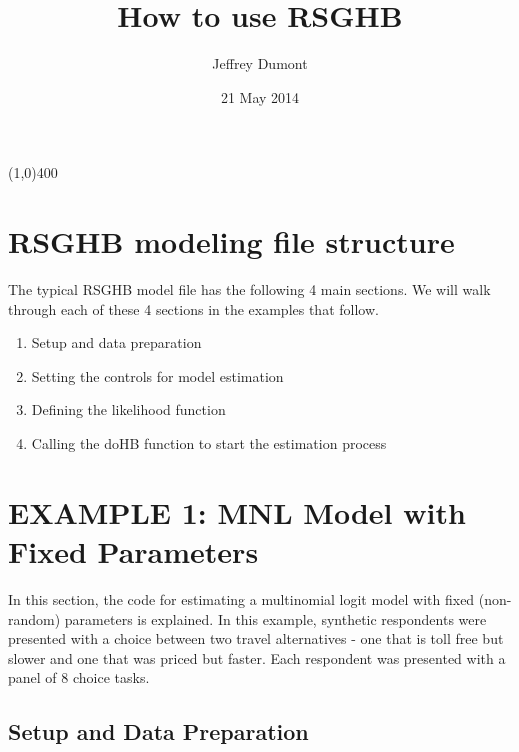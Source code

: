 \documentclass{article}
\begin{document}
\title{How to use RSGHB}
\author{Jeffrey Dumont}
\date{21 May 2014}
\maketitle
{}

\begin{center}
\line(1,0){400}
\end{center}

\section*{RSGHB modeling file structure}

The typical RSGHB model file has the following 4 main sections. We will walk through each of these 4 sections in the examples that follow.

\begin{enumerate}
     \item Setup and data preparation
     \item Setting the controls for model estimation
     \item Defining the likelihood function
     \item Calling the doHB function to start the estimation process
\end{enumerate}

\section*{EXAMPLE 1: MNL Model with Fixed Parameters}

In this section, the code for estimating a multinomial logit model with fixed (non-random) parameters is explained. In this example, synthetic respondents were presented with a choice between two travel alternatives - one that is toll free but slower and one that was priced but faster. Each respondent was presented with a panel of 8 choice tasks.

\subsection*{Setup and Data Preparation}
\end{document}
